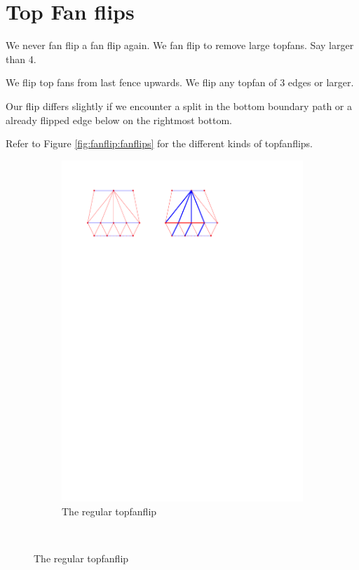 
\section{Top Fan flips}

We never fan flip a fan flip again. We fan flip to remove large topfans. Say larger than 4.


We flip top fans from last fence upwards. We flip any topfan of 3 edges or larger.

Our flip differs slightly if we encounter a split in the bottom boundary path or a already flipped edge below on the rightmost bottom.

Refer to Figure \ref{fig:fanflip:fanflips} for the different kinds of topfanflips.


\begin{figure}
  \centering
  \begin{subfigure}[b]{0.8 \textwidth}
      \includegraphics[width = \textwidth]{topFanFlips/img/regular}
      \caption{The regular topfanflip}
  \end{subfigure}
  ~


\end{figure}
